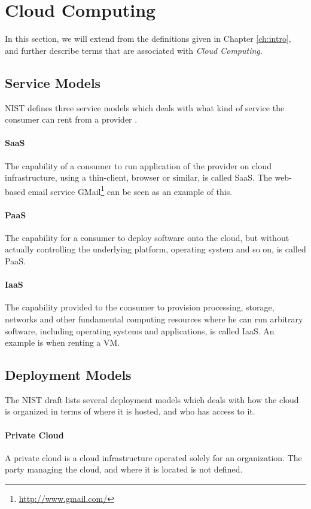 \documentclass[pdftex,english,10pt,b5paper,twoside]{book}
\begin{document}
\section{Cloud Computing}

In this section, we will extend from the definitions given in Chapter
\ref{ch:intro}, and further describe terms that are associated with
\emph{Cloud Computing}.

\subsection{Service Models} \ac{NIST} defines three service models which deals
with what kind of service the consumer can rent from a provider
\cite{cloud_nistdef}.

\paragraph{\ac{SaaS}} The capability of a consumer to run application of the
provider on cloud infrastructure, using a thin-client, browser or similar, is
called \ac{SaaS}. The web-based email service
GMail\footnote{\url{http://www.gmail.com/}} can be seen as an example of this.

\paragraph{\ac{PaaS}} The capability for a consumer to deploy software onto
the cloud, but without actually controlling the underlying platform, operating
system and so on, is called \ac{PaaS}.

\paragraph{\ac{IaaS}} The capability provided to the consumer to provision
processing, storage, networks and other fundamental computing resources where
he can run arbitrary software, including operating systems and applications, is
called \ac{IaaS}. An example is when renting a \ac{VM}.

\subsection{Deployment Models}

The \ac{NIST} draft lists several deployment models which deals with how the
cloud is organized in terms of where it is hosted, and who has access to it.

\paragraph{Private Cloud} A private cloud is a cloud infrastructure operated
solely for an organization. The party managing the cloud, and where it is
located is not defined.
\end{document}
